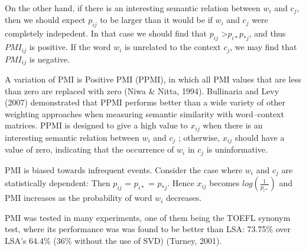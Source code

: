 On the other hand, if there is an interesting semantic relation between $w_{i}$ and $c_{j}$, then we should expect $p_{ij}$ to be larger than it would be if $w_{i}$ and $c_{j}$ were completely indepedent. In that case we should find that $p_{ij}$ >$p_{i*}$$p_{*j}$, and thus   $PMI_{ij}$ is positive. If the word $w_{i}$ is unrelated to the context $c_{j}$, we may find that   $PMI_{ij}$ is negative. 

A variation of PMI is Positive PMI (PPMI), in which all PMI values that are less than zero are replaced with zero (Niwa \& Nitta, 1994)\cite{niwa94}. Bullinaria and Levy (2007)\cite{bullinaria2007} demonstrated that PPMI performs better than a wide variety of other weighting approaches when measuring semantic similarity with word--context matrices. PPMI is designed to give a high value to $x_{ij}$ when there is an interesting semantic relation between $w_{i}$ and $c_{j}$ ; otherwise, $x_{ij}$ should have a value of zero, indicating that the occurrence of $w_{i}$ in $c_{j}$ is uninformative.

PMI is biased towards infrequent events. Consider the case where $w_{i}$ and $c_{j}$ are statistically 
dependent: Then $p_{ij}$  = $p_{i*}$ = $p_{*j}$. Hence $x_{ij}$ becomes $log (\frac{1}{p_{i*}})$ 
and PMI increases as the probability of word $w_i$ decreases. 

PMI was tested in many experiments, one of them being the TOEFL synonym test, where its performance  was was found to be better than LSA: 73.75\% over LSA's 64.4\% (36\% without the use of SVD) (Turney, 2001)\cite{turney2001mining}.

